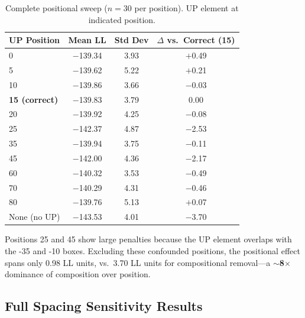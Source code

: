 \documentclass{article}
\begin{document}
\begin{table}[ht]
\caption{Complete positional sweep ($n=30$ per position). UP element at indicated position.}
\label{tab:full_positional}
\centering\small
\begin{tabular}{lccc}
\toprule
UP Position & Mean LL & Std Dev & $\Delta$ vs.\ Correct (15) \\
\midrule
0           & $-$139.34 & 3.93 & $+$0.49 \\
5           & $-$139.62 & 5.22 & $+$0.21 \\
10          & $-$139.86 & 3.66 & $-$0.03 \\
\textbf{15 (correct)} & $-$139.83 & 3.79 & 0.00 \\
20          & $-$139.92 & 4.25 & $-$0.08 \\
25          & $-$142.37 & 4.87 & $-$2.53 \\
35          & $-$139.94 & 3.75 & $-$0.11 \\
45          & $-$142.00 & 4.36 & $-$2.17 \\
60          & $-$140.32 & 3.53 & $-$0.49 \\
70          & $-$140.29 & 4.31 & $-$0.46 \\
80          & $-$139.76 & 5.13 & $+$0.07 \\
\midrule
None (no UP)& $-$143.53 & 4.01 & $-$3.70 \\
\bottomrule
\end{tabular}
\end{table}

Positions 25 and 45 show large penalties because the UP element overlaps with the -35 and -10
boxes.
Excluding these confounded positions, the positional effect spans only 0.98 LL units, vs.\
3.70 LL units for compositional removal---a \textbf{$\sim$8$\times$} dominance of composition
over position.

\subsection{Full Spacing Sensitivity Results}
\end{document}
